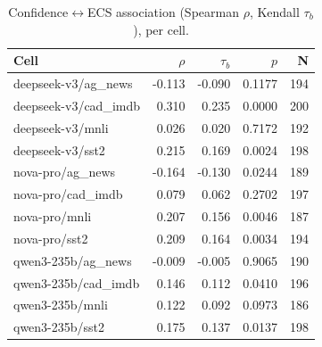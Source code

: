 \begin{table}[t]
\centering
\caption{Confidence$\leftrightarrow$ECS association (Spearman $\rho$, Kendall $\tau_b$), per cell.}
\label{tab:confidence}
\begin{tabular}{lrrrr}
\toprule
Cell & $\rho$ & $\tau_b$ & $p$ & N \\
\midrule
deepseek-v3/ag_news & -0.113 & -0.090 & 0.1177 & 194 \\
deepseek-v3/cad_imdb & 0.310 & 0.235 & 0.0000 & 200 \\
deepseek-v3/mnli & 0.026 & 0.020 & 0.7172 & 192 \\
deepseek-v3/sst2 & 0.215 & 0.169 & 0.0024 & 198 \\
nova-pro/ag_news & -0.164 & -0.130 & 0.0244 & 189 \\
nova-pro/cad_imdb & 0.079 & 0.062 & 0.2702 & 197 \\
nova-pro/mnli & 0.207 & 0.156 & 0.0046 & 187 \\
nova-pro/sst2 & 0.209 & 0.164 & 0.0034 & 194 \\
qwen3-235b/ag_news & -0.009 & -0.005 & 0.9065 & 190 \\
qwen3-235b/cad_imdb & 0.146 & 0.112 & 0.0410 & 196 \\
qwen3-235b/mnli & 0.122 & 0.092 & 0.0973 & 186 \\
qwen3-235b/sst2 & 0.175 & 0.137 & 0.0137 & 198 \\
\bottomrule
\end{tabular}
\end{table}
